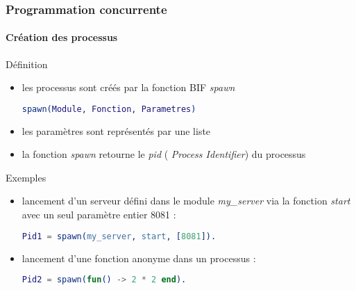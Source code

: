 \begin{frame}[fragile]
  \frametitle{Programmation concurrente}
  \framesubtitle{Création des processus}

  \begin{block}{Définition}
    \begin{itemize}
    \item les processus sont créés par la fonction BIF \textit{spawn}
      \begin{lstlisting}[language=erlang]
spawn(Module, Fonction, Parametres)
      \end{lstlisting}
    \item les paramètres sont représentés par une liste
    \item la fonction \textit{spawn} retourne le \textit{pid} (\textit{
      Process Identifier}) du processus
    \end{itemize}
  \end{block}

  \begin{exampleblock}{Exemples}
    \begin{itemize}
    \item lancement d'un serveur défini dans le module \textit{my\_server} via
      la fonction \textit{start} avec un seul paramètre entier 8081 :
      \begin{lstlisting}[language=erlang]
Pid1 = spawn(my_server, start, [8081]).
      \end{lstlisting}
    \item lancement d'une fonction anonyme dans un processus :
      \begin{lstlisting}[language=erlang]
Pid2 = spawn(fun() -> 2 * 2 end).
      \end{lstlisting}
    \end{itemize}
  \end{exampleblock}

\end{frame}

